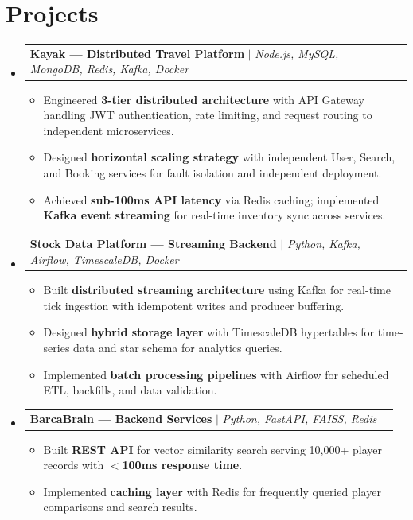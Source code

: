 \documentclass[letterpaper,10pt]{article}
\makeatletter
\newcommand{\resumeItem}[1]{\item\small{#1 \vspace{-3pt}}}
\newcommand{\resumeProjectHeading}[2]{
    \item
    \begin{tabular*}{0.97\textwidth}{l@{\extracolsep{\fill}}r}
      \small#1 & #2 \\
    \end{tabular*}\vspace{-8pt}
}
\newcommand{\resumeSubHeadingListStart}{\begin{itemize}[leftmargin=0.12in, label={}]}
\newcommand{\resumeSubHeadingListEnd}{\end{itemize}}
\newcommand{\resumeItemListStart}{\begin{itemize}[leftmargin=0.15in]}
\newcommand{\resumeItemListEnd}{\end{itemize}\vspace{-6pt}}
\makeatother
\begin{document}
\section{Projects}
    \resumeSubHeadingListStart
      \resumeProjectHeading
          {\textbf{Kayak --- Distributed Travel Platform} $|$ \emph{Node.js, MySQL, MongoDB, Redis, Kafka, Docker}}{}
          \resumeItemListStart
            \resumeItem{Engineered \textbf{3-tier distributed architecture} with API Gateway handling JWT authentication, rate limiting, and request routing to independent microservices.}
            \resumeItem{Designed \textbf{horizontal scaling strategy} with independent User, Search, and Booking services for fault isolation and independent deployment.}
            \resumeItem{Achieved \textbf{sub-100ms API latency} via Redis caching; implemented \textbf{Kafka event streaming} for real-time inventory sync across services.}
          \resumeItemListEnd
      \resumeProjectHeading
          {\textbf{Stock Data Platform --- Streaming Backend} $|$ \emph{Python, Kafka, Airflow, TimescaleDB, Docker}}{}
          \resumeItemListStart
            \resumeItem{Built \textbf{distributed streaming architecture} using Kafka for real-time tick ingestion with idempotent writes and producer buffering.}
            \resumeItem{Designed \textbf{hybrid storage layer} with TimescaleDB hypertables for time-series data and star schema for analytics queries.}
            \resumeItem{Implemented \textbf{batch processing pipelines} with Airflow for scheduled ETL, backfills, and data validation.}
          \resumeItemListEnd
      \resumeProjectHeading
          {\textbf{BarcaBrain --- Backend Services} $|$ \emph{Python, FastAPI, FAISS, Redis}}{}
          \resumeItemListStart
            \resumeItem{Built \textbf{REST API} for vector similarity search serving 10,000+ player records with \textbf{$<$100ms response time}.}
            \resumeItem{Implemented \textbf{caching layer} with Redis for frequently queried player comparisons and search results.}
          \resumeItemListEnd
    \resumeSubHeadingListEnd
\end{document}

